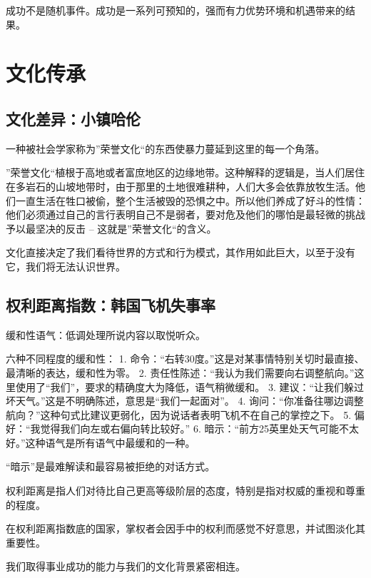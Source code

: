 \documentclass{ctexbook}
\begin{document}
成功不是随机事件。成功是一系列可预知的，强而有力优势环境和机遇带来的结果。


\part{文化传承}

\chapter{文化差异：小镇哈伦}

一种被社会学家称为”荣誉文化“的东西使暴力蔓延到这里的每一个角落。

”荣誉文化“植根于高地或者富庶地区的边缘地带。这种解释的逻辑是，当人们居住在多岩石的山坡地带时，由于那里的土地很难耕种，人们大多会依靠放牧生活。他们一直生活在牲口被偷，整个生活被毁的恐惧之中。所以他们养成了好斗的性情：他们必须通过自己的言行表明自己不是弱者，要对危及他们的哪怕是最轻微的挑战予以最坚决的反击 -- 这就是”荣誉文化“的含义。

文化直接决定了我们看待世界的方式和行为模式，其作用如此巨大，以至于没有它，我们将无法认识世界。


\chapter{权利距离指数：韩国飞机失事率}

缓和性语气：低调处理所说内容以取悦听众。

\begin{tcolorbox}
六种不同程度的缓和性：
1. 命令：“右转30度。”这是对某事情特别关切时最直接、最清晰的表达，缓和性为零。
2. 责任性陈述：“我认为我们需要向右调整航向。”这里使用了“我们”，要求的精确度大为降低，语气稍微缓和。
3. 建议：“让我们躲过坏天气。”这是不明确陈述，意思是“我们一起面对”。
4. 询问：“你准备往哪边调整航向？”这种句式比建议更弱化，因为说话者表明飞机不在自己的掌控之下。
5. 偏好：“我觉得我们向左或右偏向转比较好。”
6. 暗示：“前方25英里处天气可能不太好。”这种语气是所有语气中最缓和的一种。
\end{tcolorbox}



“暗示”是最难解读和最容易被拒绝的对话方式。


权利距离是指人们对待比自己更高等级阶层的态度，特别是指对权威的重视和尊重的程度。

在权利距离指数底的国家，掌权者会因手中的权利而感觉不好意思，并试图淡化其重要性。

我们取得事业成功的能力与我们的文化背景紧密相连。
\end{document}
